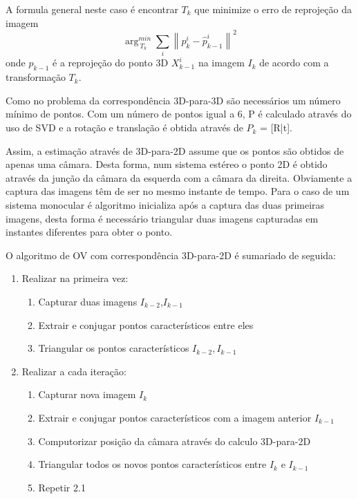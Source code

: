A formula general neste caso é encontrar \textit{$T_k$} que minimize o erro de reprojeção da imagem \[ \arg_{\ T_k}^{min} \sum_{i}{\left \| p_k^i - \hat{p}_{k-1}^i \right \|}^2 \]
onde \textit{$p_{k-1}$} é a reprojeção do ponto 3D \textit{$X_{k-1}^i$} na imagem \textit{$I_k$} de acordo com a transformação \textit{$T_k$}. 

 Como no problema da correspondência 3D-para-3D são necessários um número mínimo de pontos. Com um número de pontos igual a 6, P é calculado através do uso de SVD e a rotação e translação é obtida através de $P_k$ = [R|t]. 
 
 Assim, a estimação através de 3D-para-2D assume que os pontos são obtidos de apenas uma câmara. Desta forma, num sistema estéreo o ponto 2D é obtido através da junção da câmara da esquerda com a câmara da direita. Obviamente a captura das imagens têm de ser no mesmo instante de tempo.  Para o caso de um sistema monocular é algoritmo inicializa após a captura das duas primeiras imagens, desta forma é necessário triangular duas imagens capturadas em instantes diferentes para obter o ponto.
 
 O algoritmo de OV com correspondência 3D-para-2D é sumariado de seguida:
 \begin{enumerate}
 	\item Realizar na primeira vez:
 	\begin{enumerate}[label*=\arabic*.]
 		\item Capturar duas imagens \textit{$I_{k-2}$},\textit{$I_{k-1}$} 
 		\item Extrair e conjugar pontos característicos entre eles
 		\item Triangular os pontos característicos \textit{$I_{k-2},I_{k-1}$}
 	\end{enumerate}
 	\item Realizar a cada iteração:
 	\begin{enumerate}[label*=\arabic*.]
 		\item Capturar nova imagem \textit{$I_k$}
 		\item Extrair e conjugar pontos característicos com a imagem anterior \textit{$I_{k-1}$}
 		\item Computorizar posição da câmara através do calculo 3D-para-2D
 		\item Triangular todos os novos pontos característicos entre \textit{$I_k$} e \textit{$I_{k-1}$}
 		\item Repetir 2.1
 	\end{enumerate}
 	
 \end{enumerate}




